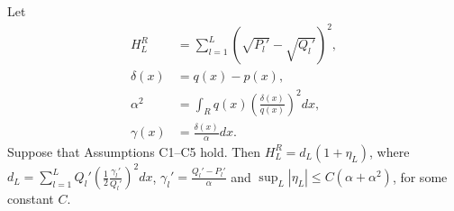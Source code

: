 \documentclass{article}
\begin{document}
\begin{lemma}
\label{prop:discrete_hellinger_chi_square}
Let
\begin{align*}
H^R_L & = \sum_{l=1}^L \left( \sqrt{P_l'} - \sqrt{Q_l'} \right)^2, \\
%
\delta(x) & = q(x) - p(x), \\
%
\alpha^2 & =  \int_R q(x) \left( \frac{\delta(x)}{q(x)} \right)^2 dx, \\
%
\gamma(x) & = \frac{\delta(x)}{\alpha} dx.
\end{align*}
Suppose that Assumptions C1--C5 hold. Then $H^R_L = d_L ( 1 + \eta_L )$,
where $d_L = \sum_{l=1}^L Q_l' \left( \frac{1}{2} \frac{\gamma_l'}{Q_l'} \right)^2 dx$, $\gamma_l' = \frac{Q_l'-P_l'}{\alpha}$ and $\sup_L |\eta_L | \leq C(\alpha + \alpha^2)$, for some constant $C$.%
\end{lemma}
\end{document}
